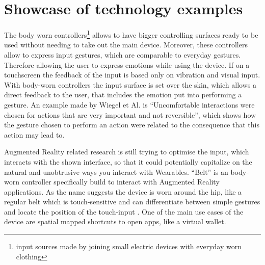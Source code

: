 \documentclass{sigchi}
\begin{document}
\section{Showcase of technology examples}
%
The body worn controllers\footnote{input sources made by joining small electric devices with everyday worn clothing} %
allows to have bigger controlling surfaces ready to be used without needing to take out the main device. Moreover, these controllers allow to express input gestures, which are comparable to everyday gestures. Therefore allowing the user to express emotions while using the device. If on a touchscreen the feedback of the input is based only on vibration and visual input. With body-worn controllers the input surface is set over the skin, which allows a direct feedback to the user, that includes the emotion put into performing a gesture. An example made by Wiegel et Al. %
\cite[p.185]{more-touch} is “Uncomfortable interactions were chosen for actions that are very important and not reversible”, which shows how the gesture chosen to perform an action were related to the consequence that this action may lead to.


Augmented Reality related research is still trying to optimise the input, which interacts with the shown interface, so that it could potentially capitalize on the natural and unobtrusive ways you interact with Wearables.
“Belt” \cite{belt} is an body-worn controller specifically build to interact with Augmented Reality applications. As the name suggests the device is worn around the hip, like a regular belt which is touch-sensitive and can differentiate between simple gestures and locate the position of the touch-input \cite[p. 2136]{belt}.%
One of the main use cases of the device are spatial mapped shortcuts to open apps, like a virtual wallet. \cite{belt}
\end{document}
